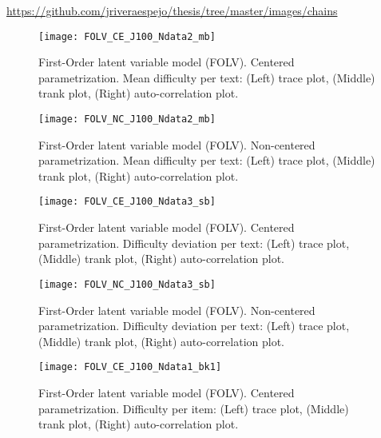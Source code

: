 \noindent \url{https://github.com/jriveraespejo/thesis/tree/master/images/chains}
%
\begin{figure}[H]
	\centering
	\texttt{[image: FOLV\_CE\_J100\_Ndata2\_mb]}
	\caption[First-Order latent variable model (FOLV). Centered parametrization. Mean difficulty per text. Trace, trank and auto-correlation plots.]%
	{First-Order latent variable model (FOLV). Centered parametrization. Mean difficulty per text: (Left) trace plot, (Middle) trank plot, (Right) auto-correlation plot.}
	\label{fig:FOLV_CE_chains1}
\end{figure}
%
\begin{figure}[H]
	\centering
	\texttt{[image: FOLV\_NC\_J100\_Ndata2\_mb]}
	\caption[First-Order latent variable model (FOLV). Non-centered parametrization. Mean difficulty per text. Trace, trank and auto-correlation plots.]%
	{First-Order latent variable model (FOLV). Non-centered parametrization. Mean difficulty per text: (Left) trace plot, (Middle) trank plot, (Right) auto-correlation plot.}
	\label{fig:FOLV_NC_chains1}
\end{figure}
%
\begin{figure}[H]
	\centering
	\texttt{[image: FOLV\_CE\_J100\_Ndata3\_sb]}
	\caption[First-Order latent variable model (FOLV). Centered parametrization. Difficulty deviation per text. Trace, trank and auto-correlation plots.]%
	{First-Order latent variable model (FOLV). Centered parametrization. Difficulty deviation per text: (Left) trace plot, (Middle) trank plot, (Right) auto-correlation plot.}
	\label{fig:FOLV_CE_chains2}
\end{figure}
%
\begin{figure}[H]
	\centering
	\texttt{[image: FOLV\_NC\_J100\_Ndata3\_sb]}
	\caption[First-Order latent variable model (FOLV). Non-centered parametrization. Difficulty deviation per text. Trace, trank and auto-correlation plots.]%
	{First-Order latent variable model (FOLV). Non-centered parametrization. Difficulty deviation per text: (Left) trace plot, (Middle) trank plot, (Right) auto-correlation plot.}
	\label{fig:FOLV_NC_chains2}
\end{figure}
%
\begin{figure}[H]
	\centering
	\texttt{[image: FOLV\_CE\_J100\_Ndata1\_bk1]}
	\caption[First-Order latent variable model (FOLV). Centered parametrization. Difficulty per item. Trace, trank and auto-correlation plots.]%
	{First-Order latent variable model (FOLV). Centered parametrization. Difficulty per item: (Left) trace plot, (Middle) trank plot, (Right) auto-correlation plot.}
	\label{fig:FOLV_CE_chains3}
\end{figure}
